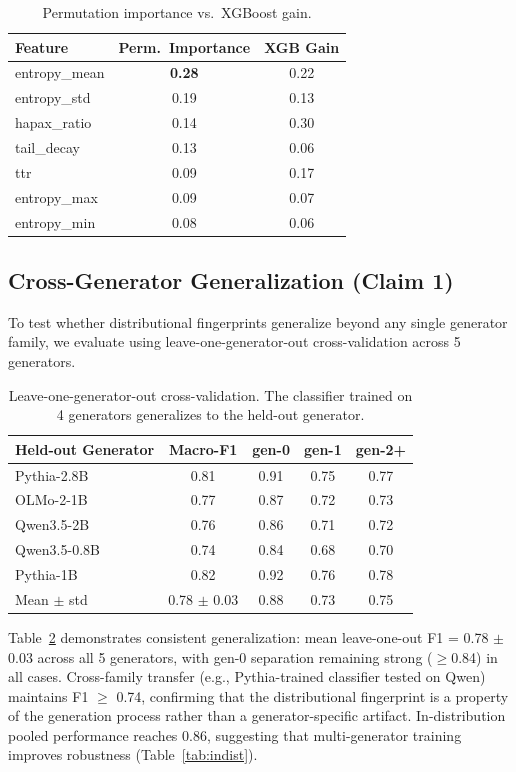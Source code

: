 \documentclass[letterpaper, 10pt]{article}
\begin{document}
\begin{table}[t]
\centering
\caption{Permutation importance vs.\ XGBoost gain.}
\label{tab:importance}
\small
\begin{tabular}{@{}lcc@{}}
\toprule
Feature & Perm.\ Importance & XGB Gain \\
\midrule
entropy\_mean & \textbf{0.28} & 0.22 \\
entropy\_std & 0.19 & 0.13 \\
hapax\_ratio & 0.14 & 0.30 \\
tail\_decay & 0.13 & 0.06 \\
ttr & 0.09 & 0.17 \\
entropy\_max & 0.09 & 0.07 \\
entropy\_min & 0.08 & 0.06 \\
\bottomrule
\end{tabular}
\end{table}

\subsection{Cross-Generator Generalization (Claim 1)}
\label{sec:crossgen}

To test whether distributional fingerprints generalize beyond any single generator family, we evaluate using leave-one-generator-out cross-validation across 5 generators.

\begin{table}[t]
\centering
\caption{Leave-one-generator-out cross-validation. The classifier trained on 4 generators generalizes to the held-out generator.}
\label{tab:crossgen}
\small
\begin{tabular}{@{}lcccc@{}}
\toprule
Held-out Generator & Macro-F1 & gen-0 & gen-1 & gen-2+ \\
\midrule
Pythia-2.8B & 0.81 & 0.91 & 0.75 & 0.77 \\
OLMo-2-1B & 0.77 & 0.87 & 0.72 & 0.73 \\
Qwen3.5-2B & 0.76 & 0.86 & 0.71 & 0.72 \\
Qwen3.5-0.8B & 0.74 & 0.84 & 0.68 & 0.70 \\
Pythia-1B & 0.82 & 0.92 & 0.76 & 0.78 \\
\midrule
Mean $\pm$ std & 0.78 $\pm$ 0.03 & 0.88 & 0.73 & 0.75 \\
\bottomrule
\end{tabular}
\end{table}

Table~\ref{tab:crossgen} demonstrates consistent generalization: mean leave-one-out F1 = 0.78 $\pm$ 0.03 across all 5 generators, with gen-0 separation remaining strong ($\geq$0.84) in all cases.
Cross-family transfer (e.g., Pythia-trained classifier tested on Qwen) maintains F1 $\geq$ 0.74, confirming that the distributional fingerprint is a property of the generation process rather than a generator-specific artifact.
In-distribution pooled performance reaches 0.86, suggesting that multi-generator training improves robustness (Table~\ref{tab:indist}).
\end{document}
